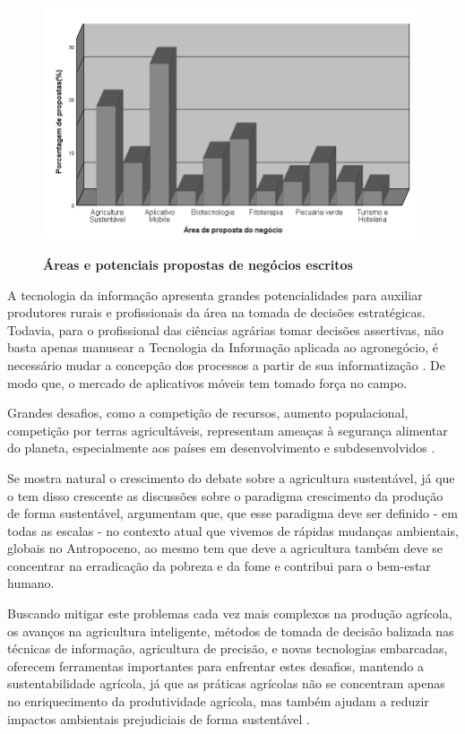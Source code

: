 \begin{figure}[H]
\centering
\caption{\textbf{Áreas e potenciais propostas de negócios escritos}}
\includegraphics[scale=0.6]{Imagens/propostas_negocios.png}
\label{figura_11}
\end{figure}


A tecnologia da informação apresenta grandes potencialidades para auxiliar produtores rurais e profissionais da área na tomada de decisões estratégicas. Todavia, para o profissional das ciências agrárias tomar decisões assertivas, não basta apenas manusear a Tecnologia da Informação aplicada ao agronegócio, é   necessário   mudar a concepção dos processos a partir de sua informatização \cite{ferraz_tecnologia_2017,sharma_systematic_2020}. De modo que, o mercado de aplicativos móveis tem tomado força no campo. 

Grandes desafios, como a competição de recursos, aumento populacional, competição por terras agricultáveis, representam ameaças à segurança alimentar do planeta, especialmente aos países em desenvolvimento e subdesenvolvidos \cite{pardey_bounds_2014}. 

Se mostra natural o crescimento do debate sobre a agricultura sustentável, já que o tem disso crescente as discussões sobre o paradigma crescimento da produção de forma sustentável, 
 argumentam que, que esse paradigma deve ser definido - em todas as escalas - no contexto atual que vivemos de rápidas mudanças ambientais, globais no Antropoceno, ao mesmo tem que deve a agricultura também deve se concentrar na erradicação da pobreza e da fome e contribui para o bem-estar humano.

Buscando mitigar este problemas cada vez mais complexos na produção agrícola, os avanços na agricultura inteligente, métodos de tomada de decisão balizada nas técnicas de informação,  agricultura de precisão, e novas tecnologias embarcadas, oferecem ferramentas importantes para enfrentar estes desafios, mantendo a sustentabilidade agrícola, já que as práticas agrícolas não se concentram apenas no enriquecimento da produtividade agrícola, mas também ajudam a reduzir impactos ambientais prejudiciais de forma sustentável \cite{adnan_effects_2018,rockstrom_sustainable_2017,ye_bio-organic_2020}. 

